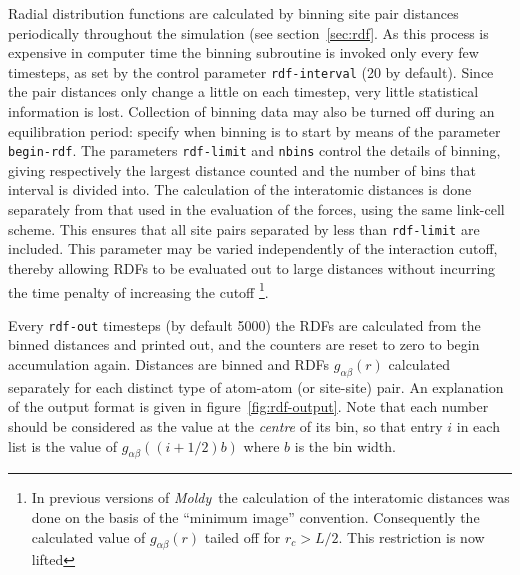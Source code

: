 \documentclass[twoside]{report}
\newcommand{\moldy}{{\em Moldy}}
\begin{document}
Radial distribution functions are calculated by binning site pair
distances periodically throughout the simulation (see
section~\ref{sec:rdf}.  As this process is expensive in computer time
the binning subroutine is invoked only every few timesteps, as set by
the control parameter \texttt{rdf-interval} (20 by default).  Since
the pair distances only change a little on each timestep, very little
statistical information is lost.  Collection of binning data may also
be turned off during an equilibration period: specify when binning is
to start by means of the parameter \texttt{begin-rdf}.  The parameters
\texttt{rdf-limit} and \texttt{nbins} control the details of binning,
giving respectively the largest distance counted and the number of
bins that interval is divided into. The calculation of the interatomic
distances is done separately from that used in the evaluation of the
forces, using the same link-cell scheme.  This ensures that all site
pairs separated by less than \texttt{rdf-limit} are included.  This
parameter may be varied independently of the interaction
cutoff, thereby allowing RDFs to be evaluated out to large distances
without incurring the time penalty of increasing the cutoff
\footnote{In previous versions of \moldy\ the calculation of the
interatomic distances was done on  the basis of the ``minimum image''
convention.  Consequently the calculated value of $g_{\alpha\beta}(r)$
tailed off for $r_c > L/2$.  This restriction is now lifted}.

Every \texttt{rdf-out} timesteps (by default 5000) the RDFs are
calculated from the binned distances and printed out, and the counters
are reset to zero to begin accumulation again.  Distances are binned
and RDFs $g_{\alpha \beta}(r)$ calculated separately for each distinct
type of atom-atom (or site-site) pair.  An explanation of the output
format is given in figure~\ref{fig:rdf-output}.  Note that each number
should be considered as the value at the {\em centre\/} of its bin, so
that entry $i$ in each list is the value of
$g_{\alpha\beta}((i+1/2)b)$ where $b$ is the bin width.
\end{document}
